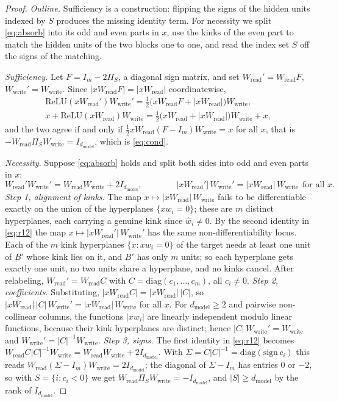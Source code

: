 \documentclass[10pt]{article}
\theoremstyle{definition}
\theoremstyle{remark}
\newcommand{\Wread}{W_{\mathrm{read}}}
\newcommand{\Wwrite}{W_{\mathrm{write}}}
\newcommand{\dm}{d_{\mathrm{model}}}
\begin{document}
\begin{proof}
\emph{Outline.} Sufficiency is a construction: flipping the signs of the hidden units indexed by $S$ produces the missing identity term. For necessity we split \eqref{eq:absorb} into its odd and even parts in $x$, use the kinks of the even part to match the hidden units of the two blocks one to one, and read the index set $S$ off the signs of the matching.

\emph{Sufficiency.} Let $F = I_m - 2\Pi_S$, a diagonal sign matrix, and set $\Wread' = \Wread F$, $\Wwrite' = \Wwrite$. Since $|x\Wread F| = |x\Wread|$ coordinatewise,
\begin{gather*}
\mathrm{ReLU}(x\Wread')\Wwrite' = \tfrac12\big(x\Wread F + |x\Wread|\big)\Wwrite,\\
x + \mathrm{ReLU}(x\Wread)\Wwrite = \tfrac12\big(x\Wread + |x\Wread|\big)\Wwrite + x ,
\end{gather*}
and the two agree if and only if $\tfrac12 x\Wread(F - I_m)\Wwrite = x$ for all $x$, that is $-\Wread\Pi_S\Wwrite = I_{\dm}$, which is \eqref{eq:cond}.

\emph{Necessity.} Suppose \eqref{eq:absorb} holds and split both sides into odd and even parts in $x$:
\begin{equation}\label{eq:r12}
\Wread'\Wwrite' = \Wread\Wwrite + 2I_{\dm},\qquad\qquad |x\Wread'|\,\Wwrite' = |x\Wread|\,\Wwrite\ \ \text{for all } x .
\end{equation}
\emph{Step 1, alignment of kinks.} The map $x \mapsto |x\Wread|\,\Wwrite$ fails to be differentiable exactly on the union of the hyperplanes $\{x w_i = 0\}$; these are $m$ distinct hyperplanes, each carrying a genuine kink since $\hat w_i \neq 0$. By the second identity in \eqref{eq:r12} the map $x \mapsto |x\Wread'|\,\Wwrite'$ has the same non-differentiability locus. Each of the $m$ kink hyperplanes $\{x : x w_i = 0\}$ of the target needs at least one unit of $B'$ whose kink lies on it, and $B'$ has only $m$ units; so each hyperplane gets exactly one unit, no two units share a hyperplane, and no kinks cancel. After relabeling, $\Wread' = \Wread C$ with $C = \mathrm{diag}(c_1, \dots, c_m)$, all $c_i \neq 0$.
\emph{Step 2, coefficients.} Substituting, $|x\Wread C| = |x\Wread|\,|C|$, so $|x\Wread|\,|C|\,\Wwrite' = |x\Wread|\,\Wwrite$ for all $x$. For $\dm \ge 2$ and pairwise non-collinear columns, the functions $|x w_i|$ are linearly independent modulo linear functions, because their kink hyperplanes are distinct; hence $|C|\,\Wwrite' = \Wwrite$ and $\Wwrite' = |C|^{-1}\Wwrite$.
\emph{Step 3, signs.} The first identity in \eqref{eq:r12} becomes $\Wread C|C|^{-1}\Wwrite = \Wread\Wwrite + 2I_{\dm}$. With $\Sigma = C|C|^{-1} = \mathrm{diag}(\mathrm{sign}\,c_i)$ this reads $\Wread(\Sigma - I_m)\Wwrite = 2I_{\dm}$; the diagonal of $\Sigma - I_m$ has entries $0$ or $-2$, so with $S = \{i : c_i < 0\}$ we get $\Wread\Pi_S\Wwrite = -I_{\dm}$, and $|S| \ge \dm$ by the rank of $I_{\dm}$.
\end{proof}
\end{document}
